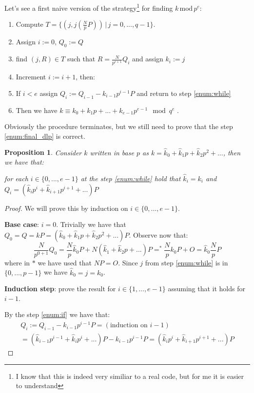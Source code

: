 \documentclass{article}
\DeclareMathOperator{\eqb}{=}
\theoremstyle{plain}
\newtheorem{prop}[teo]{Proposition}
\theoremstyle{remark}
\theoremstyle{definition}
\begin{document}
Let's see a first naive version of the strategy\footnote{I know that this is indeed very similiar to a real code, but for me it is easier to understand} for finding $k \,\text{mod}\, p^e$:
\begin{enumerate}
	\item Compute $T = \{ (j,j\left(\frac{N}{p}P\right)) \,|\, j = 0,...,q-1 \}$.
	\item Assign $i := 0$, $Q_0 := Q$
	\item \label{enum:while} find $(j,R)\in T$ such that $R = \frac{N}{p^{i+1}}Q_i$ and assign $k_i := j$
	\item Increment $i := i + 1$, then:
	\item \label{enum:if} If $i < e$ assign $Q_i := Q_{i-1} - k_{i-1} p^{i-1}P$ and return to step \ref{enum:while}
	\item Then we have $k \equiv k_0 + k_1p + ... + k_{e-1}p^{e-1} \mod q^e$ \label{enum:final_dlp}.
\end{enumerate}

Obviously the procedure terminates, but we still need to prove that the step \ref{enum:final_dlp} is correct.

\begin{prop}
	\label{prop:corr_dlp}
	Consider $k$ written in base $p$ as $k = \hat{k}_0 + \hat{k}_1p + \hat{k}_2p^2 + ...$, then we have that:

	for each $i \in \{0,...,e-1\}$ at the step \ref{enum:while} hold that 
	$\hat{k}_i = k_i$ and $Q_i = (\hat{k}_ip^i + \hat{k}_{i+1}p^{i+1} + ... )P$
\end{prop}

\begin{proof}
	We will prove this by induction on $i \in \{ 0 ,..., e-1\}$.

	\textbf{Base case}: $i=0$. Trivially we have that $Q_0 = Q = kP = (\hat{k}_0 + \hat{k}_1p + \hat{k}_2p^2 + ...)P$. Observe now that:
	\begin{equation}
		\label{eq:prop:base}
		\frac{N}{p^{0+1}}Q_0 = \frac{N}{p}\hat{k}_0 P + N(\hat{k}_1 + \hat{k}_2p + ...)P \eqb^* \frac{N}{p}k_0 P + O = \hat{k}_0 \frac{N}{p} P
	\end{equation}
	where in $*$ we have used that $NP = O$. Since $j$ from step \ref{enum:while} is in $\{0,...,p-1\}$ we have $\hat{k}_0 = j = k_0$.

	\textbf{Induction step}: prove the result for $i \in \{1,...,e-1\}$ assuming that it holds for $i-1$. 

	By the step \ref{enum:if} we have that:
	\begin{multline*}
		Q_i := Q_{i-1} - k_{i-1} p^{i-1}P = (\text{induction on }i-1) \\
		= (\hat{k}_{i-1}p^{i-1} + \hat{k}_{i}p^{i} + ... )P - k_{i-1} p^{i-1}P = (\hat{k}_ip^i + \hat{k}_{i+1}p^{i+1} + ... )P
	\end{multline*}	
	
\end{proof}
\end{document}
